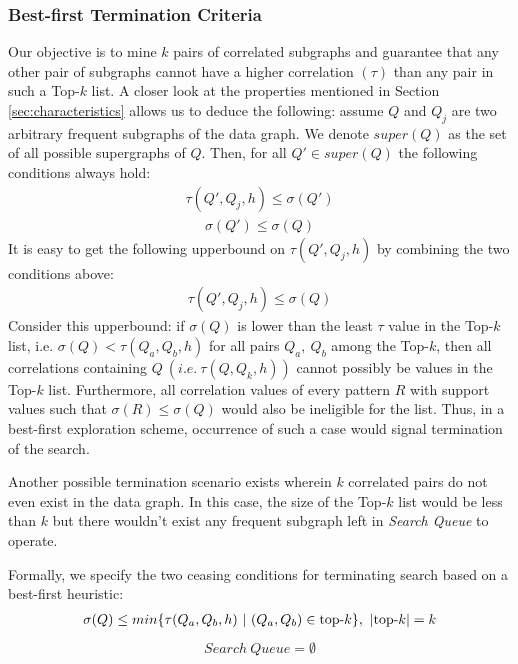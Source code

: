 \subsubsection{Best-first Termination Criteria}
\label{subsubsec:exact_algo_ceasing}
Our objective is to mine $k$ pairs of correlated subgraphs and guarantee that any other pair of subgraphs cannot have a higher correlation $(\tau)$ than any pair in such a {\sf Top-$k$} list.
A closer look at the properties mentioned in Section \ref{sec:characteristics} allows us to deduce the following:
assume $Q$ and $Q_j$ are two arbitrary frequent subgraphs of the data graph.
We denote $super(Q)$ as the set of all possible supergraphs of $Q$. Then, for all $Q'\in super(Q)$ the following conditions always hold:
\begin{align} \tau(Q',Q_j,h)\le \sigma(Q')\end{align}
\begin{align} \sigma(Q')\le \sigma(Q) \end{align}
It is easy to get the following upperbound on $\tau(Q',Q_j,h)$ by combining the two conditions above:
\begin{align} \tau(Q',Q_j,h) \le \sigma(Q) \end{align}
Consider this upperbound: if $\sigma(Q)$ is lower than the least $\tau$ value in
the {\sf Top-$k$} list, i.e. $\sigma(Q)<\tau(Q_a,Q_b,h)$ for all
pairs $Q_a,\ Q_b$ among the {\sf Top-$k$}, then all correlations
containing $Q\ (i.e.\ \tau(Q,Q_k,h))$ cannot
possibly be values in the {\sf Top-$k$} list. Furthermore, all correlation
values of every pattern $R$ with support values such that $\sigma(R)\leq
\sigma(Q)$ would also be ineligible for the list. Thus, in a best-first exploration
scheme, occurrence of such a case would signal termination of the search.


\par Another possible termination scenario exists wherein $k$ correlated pairs
do not even exist in the data graph. In this case, the size of the {\sf Top-$k$} list would be less than $k$ but there wouldn't exist
any frequent subgraph left in \textit{Search Queue} to operate.

\par Formally, we specify the two ceasing conditions for terminating search
based on a best-first heuristic:
\begin{align} \sigma(Q)\le min\{\tau(Q_a, Q_b, h)\ |\ (Q_a, Q_b)\in \textnormal{top-}k\},\ |\textnormal{top-}k|=k\end{align}
\begin{align} Search\ Queue = \emptyset\end{align}

